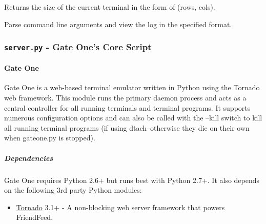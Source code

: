 \documentclass[letterpaper,10pt,openany]{sphinxmanual}
\begin{document}

\begin{fulllineitems}
\label{Developer/logviewer:logviewer.get_terminal_size}
Returns the size of the current terminal in the form of (rows, cols).

\end{fulllineitems}


\begin{fulllineitems}
\label{Developer/logviewer:logviewer.main}
Parse command line arguments and view the log in the specified format.

\end{fulllineitems}



\subsubsection{\texttt{server.py} - Gate One's Core Script}
\label{Developer/server:module-gateone.core.server}\label{Developer/server::doc}\label{Developer/server:server-py-gate-one-s-core-script}

\paragraph{Gate One}
\label{Developer/server:gate-one}\label{Developer/server:gateone-py}
Gate One is a web-based terminal emulator written in Python using the Tornado
web framework.  This module runs the primary daemon process and acts as a
central controller for all running terminals and terminal programs.  It supports
numerous configuration options and can also be called with the --kill switch
to kill all running terminal programs (if using dtach--otherwise they die on
their own when gateone.py is stopped).


\subparagraph{Dependencies}
\label{Developer/server:dependencies}
Gate One requires Python 2.6+ but runs best with Python 2.7+.  It also depends
on the following 3rd party Python modules:
\begin{itemize}
\item {} 
\href{http://www.tornadoweb.org/}{Tornado} 3.1+ - A non-blocking web server framework that powers FriendFeed.

\end{itemize}
\end{document}
